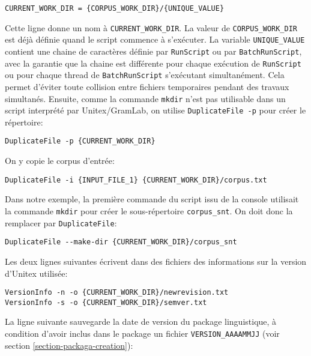 \begin{Verbatim}[fontsize=\small,fontfamily=helvetica]
CURRENT_WORK_DIR = {CORPUS_WORK_DIR}/{UNIQUE_VALUE}
\end{Verbatim}

\noindent Cette ligne donne un nom à \verb$CURRENT_WORK_DIR$. La valeur de
\verb$CORPUS_WORK_DIR$ est déjà définie quand le script commence à s'exécuter. La variable
\verb$UNIQUE_VALUE$ contient une chaine de caractères définie par \verb$RunScript$ ou par
\verb$BatchRunScript$, avec la garantie que la chaine est différente pour chaque exécution de
\verb$RunScript$ ou pour chaque thread de \verb$BatchRunScript$ s’exécutant simultanément. Cela
permet d'éviter toute collision entre fichiers temporaires pendant des travaux simultanés. Ensuite,
comme la commande \verb$mkdir$ n’est pas utilisable dans un script interprété par Unitex/GramLab, on
utilise \verb$DuplicateFile -p$ pour créer le répertoire:

\begin{Verbatim}[fontsize=\small,fontfamily=helvetica]
DuplicateFile -p {CURRENT_WORK_DIR}
\end{Verbatim}

\noindent On y copie le corpus d’entrée:

\begin{Verbatim}[fontsize=\small,fontfamily=helvetica]
DuplicateFile -i {INPUT_FILE_1} {CURRENT_WORK_DIR}/corpus.txt
\end{Verbatim}

\noindent Dans notre exemple, la première commande du script issu de la console utilisait la commande
\verb$mkdir$ pour créer le sous-répertoire \verb$corpus_snt$. On doit donc la remplacer par
\verb$DuplicateFile$:

\begin{Verbatim}[fontsize=\small,fontfamily=helvetica]
DuplicateFile --make-dir {CURRENT_WORK_DIR}/corpus_snt
\end{Verbatim}

\noindent Les deux lignes suivantes écrivent dans des fichiers des informations sur la version d'Unitex
utilisée:


\begin{Verbatim}[fontsize=\small,fontfamily=helvetica]
VersionInfo -n -o {CURRENT_WORK_DIR}/newrevision.txt
VersionInfo -s -o {CURRENT_WORK_DIR}/semver.txt
\end{Verbatim}

\noindent La ligne suivante sauvegarde la date de version du package linguistique, à condition d'avoir
inclus dans le package un fichier \verb$VERSION_AAAAMMJJ$ (voir section \ref{section-packaga-creation}):

